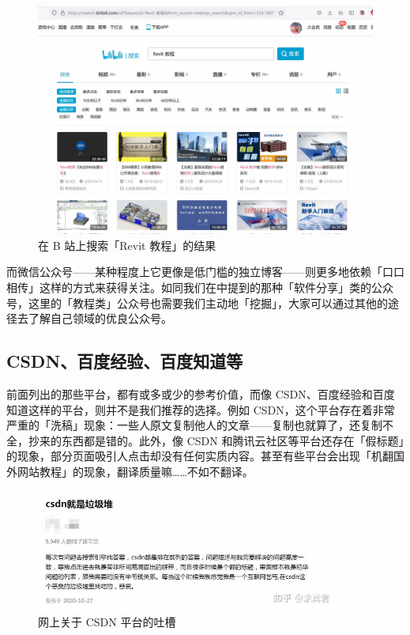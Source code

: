 \begin{figure}[htb!]
  \centering
  \includegraphics[width=12cm]{assets/Bilibili.jpg}
  \caption{在 B 站上搜索「Revit 教程」的结果}
  \label{Bilibili}
\end{figure}

而微信公众号——某种程度上它更像是低门槛的独立博客——则更多地依赖「口口相传」这样的方式来获得关注。如同我们在中提到的那种「软件分享」类的公众号，这里的「教程类」公众号也需要我们主动地「挖掘」，大家可以通过其他的途径去了解自己领域的优良公众号。

\subsection{CSDN、百度经验、百度知道等}

前面列出的那些平台，都有或多或少的参考价值，而像 CSDN、百度经验和百度知道这样的平台，则并不是我们推荐的选择。例如 CSDN，这个平台存在着非常严重的「洗稿」现象：一些人原文复制他人的文章——复制也就算了，还复制不全，抄来的东西都是错的。此外，像 CSDN 和腾讯云社区等平台还存在「假标题」的现象，部分页面吸引人点击却没有任何实质内容。甚至有些平台会出现「机翻国外网站教程」的现象，翻译质量嘛……不如不翻译。

\begin{figure}[htb!]
  \centering
  \includegraphics[width=10cm]{assets/CSDN_junk.jpg}
  \caption{网上关于 CSDN 平台的吐槽}
  \label{CSDN_junk}
\end{figure}

